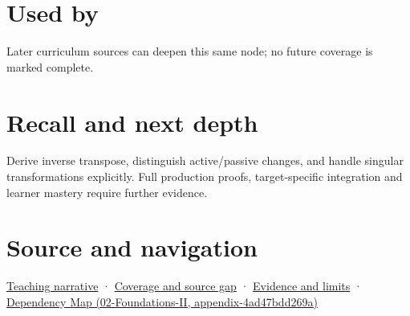 \section{Used by}\label{appendix-46da295c6787-used-by}

Later curriculum sources can deepen this same node; no future coverage is marked complete.

\section{Recall and next depth}\label{appendix-46da295c6787-recall-and-next-depth}

Derive inverse transpose, distinguish active/passive changes, and handle singular transformations explicitly. Full production proofs, target-specific integration and learner mastery require further evidence.

\section{Source and navigation}\label{appendix-46da295c6787-source-and-navigation}

\href{Continuous\%20Notes/Computing\%20Foundations\%20-\%20From\%20Bits\%20to\%20C++\%20and\%20Systems\%20APIs\#A\%20normal\%20is\%20a\%20measuring\%20rule\%20before\%20it\%20is\%20an\%20arrow}{Teaching narrative} · \hyperref[appendix-fd090d982a15-phase-6---parts-501-600]{Coverage and source gap} · \hyperref[appendix-a103e7846d21-phase-6---source-analysis-and-verification]{Evidence and limits} · \href{../02-Foundations-II/main.pdf\#nameddest=appendix-4ad47bdd269a}{Dependency Map (02-Foundations-II, appendix-4ad47bdd269a)}
